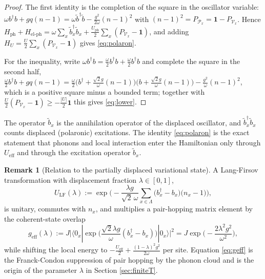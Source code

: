 \documentclass[11pt]{article}
\numberwithin{equation}{section}
\newcommand{\id}{\mathbf{1}}
\newcommand{\Lamb}{\Lambda}
\newcommand{\ph}{\mathrm{ph}}
\newcommand{\eff}{\mathrm{eff}}
\theoremstyle{definition}
\newtheorem{remark}[theorem]{Remark}
\begin{document}
\begin{proof}
The first identity is the completion of the square in the oscillator variable:
$\omega b^{\dagger}b+g q(n-1)=\omega\tilde b^{\dagger}\tilde b-\frac{g^{2}}{2\omega}(n-1)^{2}$
with $(n-1)^{2}=P_{\mathcal{P}_{x}}=\id-P_{\mathcal{V}_{x}}$. Hence
$H_{\ph}+H_{\text{el-ph}}=\omega\sum_{x}\tilde b_{x}^{\dagger}\tilde b_{x}+\frac{U_{\mathrm{ph}}}{2}\sum_{x}(P_{\mathcal{V}_{x}}-\id)$,
and adding $H_{U}=\frac{U}{2}\sum_{x}(P_{\mathcal{V}_{x}}-\id)$ gives \eqref{eq:polaron}.

For the inequality, write $\omega b^{\dagger}b=\frac{\omega}{2}b^{\dagger}b+\frac{\omega}{2}b^{\dagger}b$
and complete the square in the second half,
$\frac{\omega}{2}b^{\dagger}b+g q(n-1)=\frac{\omega}{2}\big(b^{\dagger}+\frac{\sqrt2 g}{\omega}(n-1)\big)\big(b+\frac{\sqrt2 g}{\omega}(n-1)\big)-\frac{g^{2}}{\omega}(n-1)^{2}$,
which is a positive square minus a bounded term; together with
$\frac{U}{2}(P_{\mathcal{V}_{x}}-\id)\ge-\frac{|U|}{2}\id$ this gives \eqref{eq:lower}.
\end{proof}

The operator $\tilde b_{x}$ is the annihilation operator of the displaced oscillator,
and $\tilde b_{x}^{\dagger}\tilde b_{x}$ counts displaced (polaronic) excitations. The
identity \eqref{eq:polaron} is the exact statement that phonons and local interaction enter the
Hamiltonian only through $U_{\eff}$ and through the excitation operator $\tilde b_{x}$.

\begin{remark}[Relation to the partially displaced variational state]\label{rem:LF}
A Lang-Firsov transformation \cite{langfirsov1963} with displacement fraction
$\lambda\in[0,1]$,
\begin{equation}
U_{\mathrm{LF}}(\lambda):=\exp\Big(-\frac{\lambda g}{\sqrt2\,\omega}\sum_{x\in\Lamb}\big(b_{x}^{\dagger}-b_{x}\big)\big(n_{x}-1\big)\Big),
\label{eq:LF}
\end{equation}
is unitary, commutes with $n_{x}$, and multiplies a pair-hopping matrix element by the
coherent-state overlap
\begin{equation}
g_{\eff}(\lambda):=J\Big|\langle 0_{x}|\exp\Big(\frac{\sqrt2\lambda g}{\omega}(b_{x}^{\dagger}-b_{x})\Big)|0_{x}\rangle\Big|^{2}
=J\exp\Big(-\frac{2\lambda^{2}g^{2}}{\omega^{2}}\Big),
\label{eq:geff}
\end{equation}
while shifting the local energy to $-\frac{U_{\eff}}{2}+\frac{(1-\lambda)^{2}g^{2}}{2\omega}$
per site. Equation \eqref{eq:geff} is the Franck-Condon suppression of pair hopping by the
phonon cloud and is the origin of the parameter $\lambda$ in Section \ref{sec:finiteT}.
\end{remark}
\end{document}
